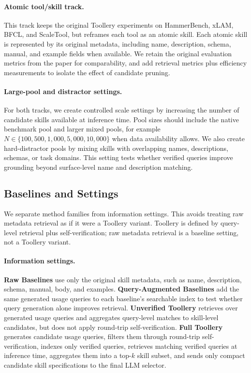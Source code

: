 \documentclass[11pt]{article}
\begin{document}
\paragraph{Atomic tool/skill track.}
This track keeps the original Toollery experiments on HammerBench, xLAM, BFCL,
and ScaleTool, but reframes each tool as an atomic skill. Each atomic skill is
represented by its original metadata, including name, description, schema,
manual, and example fields when available. We retain the original evaluation
metrics from the paper for comparability, and add retrieval metrics plus
efficiency measurements to isolate the effect of candidate pruning.

\paragraph{Large-pool and distractor settings.}
For both tracks, we create controlled scale settings by increasing the number of
candidate skills available at inference time. Pool sizes should include the
native benchmark pool and larger mixed pools, for example $N \in \{100, 500,
1{,}000, 5{,}000, 10{,}000\}$ when data availability allows. We also create
hard-distractor pools by mixing skills with overlapping names, descriptions,
schemas, or task domains. This setting tests whether verified queries improve
grounding beyond surface-level name and description matching.

\subsection{Baselines and Settings}
\label{subsec:baselines}

We separate method families from information settings. This avoids treating raw
metadata retrieval as if it were a Toollery variant. Toollery is defined by query-level
retrieval plus self-verification; raw metadata retrieval is a baseline setting,
not a Toollery variant.

\paragraph{Information settings.}
\textbf{Raw Baselines} use only the original skill metadata, such as name,
description, schema, manual, body, and examples. \textbf{Query-Augmented
Baselines} add the same generated usage queries to each baseline's searchable
index to test whether query generation alone improves retrieval. \textbf{
Unverified Toollery} retrieves over generated usage queries and aggregates
query-level matches to skill-level candidates, but does not apply round-trip
self-verification. \textbf{Full Toollery} generates candidate usage queries,
filters them through round-trip self-verification, indexes only verified queries,
retrieves matching verified queries at inference time, aggregates them into a
top-$k$ skill subset, and sends only compact candidate skill specifications to
the final LLM selector.
\end{document}
